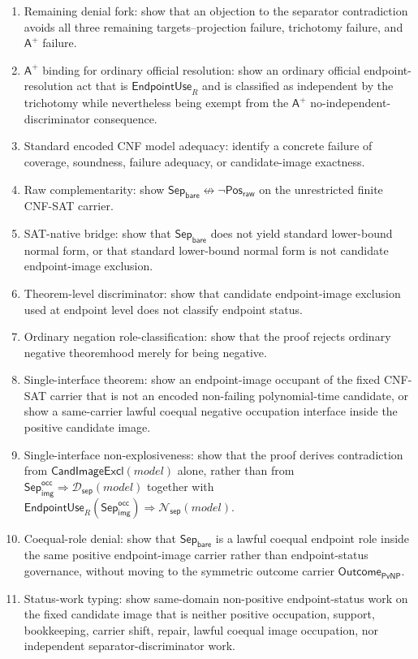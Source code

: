 \documentclass[11pt]{article}
\theoremstyle{definition}
\theoremstyle{remark}
\newcommand{\PosRaw}{\mathsf{Pos}_{\mathsf{raw}}}
\newcommand{\SepBare}{\mathsf{Sep}_{\mathsf{bare}}}
\newcommand{\SepImgOcc}{\mathsf{Sep}_{\mathsf{img}}^{\mathsf{occ}}}
\newcommand{\Aplus}{\mathsf{A}^{+}}
\newcommand{\EndpointUse}{\mathsf{EndpointUse}}
\newcommand{\SepDisc}{\mathcal{D}_{\mathsf{sep}}}
\newcommand{\NoSepDisc}{\mathcal{N}_{\mathsf{sep}}}
\newcommand{\CandImageExcl}{\mathsf{CandImageExcl}}
\newcommand{\OutcomePvNP}{\mathsf{Outcome}_{\mathsf{PvNP}}}
\begin{document}
\begin{enumerate}
\item Remaining denial fork: show that an objection to the separator contradiction avoids all three remaining targets--projection failure, trichotomy failure, and \(\Aplus\) failure.
\item \(\Aplus\) binding for ordinary official resolution: show an ordinary official endpoint-resolution act that is \(\EndpointUse_R\) and is classified as independent by the trichotomy while nevertheless being exempt from the \(\Aplus\) no-independent-discriminator consequence.
\item Standard encoded CNF model adequacy: identify a concrete failure of coverage, soundness, failure adequacy, or candidate-image exactness.
\item Raw complementarity: show \(\SepBare\not\leftrightarrow\neg\PosRaw\) on the unrestricted finite CNF-SAT carrier.
\item SAT-native bridge: show that \(\SepBare\) does not yield standard lower-bound normal form, or that standard lower-bound normal form is not candidate endpoint-image exclusion.
\item Theorem-level discriminator: show that candidate endpoint-image exclusion used at endpoint level does not classify endpoint status.
\item Ordinary negation role-classification: show that the proof rejects ordinary negative theoremhood merely for being negative.
\item Single-interface theorem: show an endpoint-image occupant of the fixed CNF-SAT carrier that is not an encoded non-failing polynomial-time candidate, or show a same-carrier lawful coequal negative occupation interface inside the positive candidate image.
\item Single-interface non-explosiveness: show that the proof derives contradiction from \(\CandImageExcl(model)\) alone, rather than from \(\SepImgOcc\Rightarrow\SepDisc(model)\) together with \(\EndpointUse_R(\SepImgOcc)\Rightarrow\NoSepDisc(model)\).
\item Coequal-role denial: show that \(\SepBare\) is a lawful coequal endpoint role inside the same positive endpoint-image carrier rather than endpoint-status governance, without moving to the symmetric outcome carrier \(\OutcomePvNP\).
\item Status-work typing: show same-domain non-positive endpoint-status work on the fixed candidate image that is neither positive occupation, support, bookkeeping, carrier shift, repair, lawful coequal image occupation, nor independent separator-discriminator work.

\end{enumerate}
\end{document}
